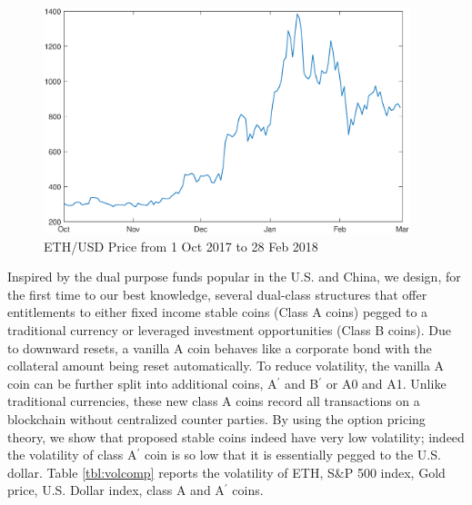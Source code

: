 \documentclass[final,pdftex]{ectaart}
\newcommand{\Ap}{A\ensuremath{^\prime}\xspace}
\newcommand{\Bp}{B\ensuremath{^\prime}\xspace}
\theoremstyle{plain}
\begin{document}
\begin{figure}[h]
\begin{centering}
\includegraphics[width=0.95\textwidth]{eth_price}
\par\end{centering}
\caption{ETH/USD Price from 1 Oct 2017 to 28 Feb 2018}\label{fig:ethprice}
\end{figure}






Inspired by the dual purpose funds popular in the U.S. and China, we design, for the first time to our best knowledge, several dual-class structures that offer entitlements to either fixed income stable coins (Class A coins) pegged to a traditional currency or leveraged investment opportunities (Class B coins). Due to downward resets, a vanilla A coin behaves like a corporate bond with the collateral amount being reset automatically. To reduce volatility, the vanilla A coin can be further split into additional coins, \Ap and \Bp or A0 and A1. Unlike traditional currencies, these new class A coins record all transactions on a blockchain without centralized counter parties. By using the option pricing theory, we show that proposed stable coins indeed have very low volatility; indeed the volatility of class \Ap coin is so low that it is essentially pegged to the U.S. dollar.
Table \ref{tbl:volcomp} reports the volatility of ETH, S\&P 500 index, Gold price, U.S. Dollar index, class A and \Ap coins.
\end{document}
